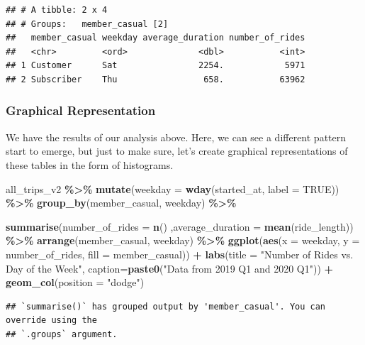 \documentclass[
]{article}
\newenvironment{Shaded}{\begin{snugshade}}{\end{snugshade}}
\newcommand{\AttributeTok}[1]{\textcolor[rgb]{0.13,0.29,0.53}{#1}}
\newcommand{\ConstantTok}[1]{\textcolor[rgb]{0.56,0.35,0.01}{#1}}
\newcommand{\FunctionTok}[1]{\textcolor[rgb]{0.13,0.29,0.53}{\textbf{#1}}}
\newcommand{\NormalTok}[1]{#1}
\newcommand{\SpecialCharTok}[1]{\textcolor[rgb]{0.81,0.36,0.00}{\textbf{#1}}}
\newcommand{\StringTok}[1]{\textcolor[rgb]{0.31,0.60,0.02}{#1}}
\begin{document}
\begin{verbatim}
## # A tibble: 2 x 4
## # Groups:   member_casual [2]
##   member_casual weekday average_duration number_of_rides
##   <chr>         <ord>              <dbl>           <int>
## 1 Customer      Sat                2254.            5971
## 2 Subscriber    Thu                 658.           63962
\end{verbatim}

\subsubsection{Graphical Representation}\label{graphical-representation}

We have the results of our analysis above. Here, we can see a different
pattern start to emerge, but just to make sure, let's create graphical
representations of these tables in the form of histograms.

\begin{Shaded}
\begin{Highlighting}[]
\NormalTok{all\_trips\_v2 }\SpecialCharTok{\%\textgreater{}\%}
  \FunctionTok{mutate}\NormalTok{(}\AttributeTok{weekday =} \FunctionTok{wday}\NormalTok{(started\_at, }\AttributeTok{label =} \ConstantTok{TRUE}\NormalTok{)) }\SpecialCharTok{\%\textgreater{}\%}
  \FunctionTok{group\_by}\NormalTok{(member\_casual, weekday) }\SpecialCharTok{\%\textgreater{}\%}
  
  \FunctionTok{summarise}\NormalTok{(}\AttributeTok{number\_of\_rides =} \FunctionTok{n}\NormalTok{()}
\NormalTok{            ,}\AttributeTok{average\_duration =} \FunctionTok{mean}\NormalTok{(ride\_length)) }\SpecialCharTok{\%\textgreater{}\%}
  \FunctionTok{arrange}\NormalTok{(member\_casual, weekday) }\SpecialCharTok{\%\textgreater{}\%}
  \FunctionTok{ggplot}\NormalTok{(}\FunctionTok{aes}\NormalTok{(}\AttributeTok{x =}\NormalTok{ weekday, }\AttributeTok{y =}\NormalTok{ number\_of\_rides, }\AttributeTok{fill =}\NormalTok{ member\_casual)) }\SpecialCharTok{+}
  \FunctionTok{labs}\NormalTok{(}\AttributeTok{title =} \StringTok{"Number of Rides vs. Day of the Week"}\NormalTok{,}
       \AttributeTok{caption=}\FunctionTok{paste0}\NormalTok{(}\StringTok{"Data from 2019 Q1 and 2020 Q1"}\NormalTok{)) }\SpecialCharTok{+}
  \FunctionTok{geom\_col}\NormalTok{(}\AttributeTok{position =} \StringTok{"dodge"}\NormalTok{)}
\end{Highlighting}
\end{Shaded}

\begin{verbatim}
## `summarise()` has grouped output by 'member_casual'. You can override using the
## `.groups` argument.
\end{verbatim}
\end{document}
